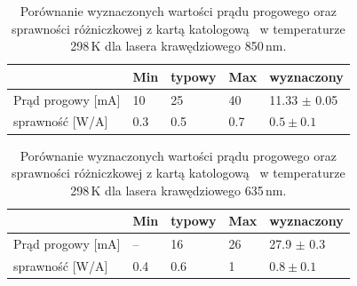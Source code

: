 \begin{table}
\begin{center}
\label{tab:tabela3}
\caption{Porównanie wyznaczonych wartości prądu progowego oraz sprawności różniczkowej z kartą katologową~\cite{spec_edge_850}
 w temperaturze 298\,K dla lasera krawędziowego 850\,nm. }
\begin{adjustbox}{max width=\textwidth}
\begin{tabular}{ | C{3.5cm}|  C{1.5cm} | C{1.5cm} | C{1.5cm}| C{3.5cm}|}
\hline
         &   Min  & typowy & Max   & wyznaczony        \\ \hline
Prąd progowy [mA] &  10    &  25    & 40    & 11.33 $\pm$ 0.05  \\ \hline
sprawność [W/A]     &  0.3   &  0.5   & 0.7   & $0.5 \pm 0.1$     \\ \hline
\end{tabular}
\end{adjustbox}
\end{center}
\end{table}
\begin{table}
\begin{center}
\label{tab:tabela4}
\caption{Porównanie wyznaczonych wartości prądu progowego oraz sprawności różniczkowej z kartą katologową~\cite{spec_edge_635}
 w temperaturze 298\,K dla lasera krawędziowego 635\,nm. }
\begin{adjustbox}{max width=\textwidth}
\begin{tabular}{ | C{3.5cm}|  C{1.5cm} | C{1.5cm} | C{1.5cm}| C{3.5cm}|}
\hline
        &   Min  & typowy & Max   & wyznaczony        \\ \hline
Prąd progowy [mA] &  --    &  16    & 26    & 27.9 $\pm$ 0.3  \\ \hline
sprawność [W/A]      &  0.4   &  0.6   & 1  &  $0.8 \pm 0.1$       \\ \hline
\end{tabular}
\end{adjustbox}
\end{center}
\end{table}

